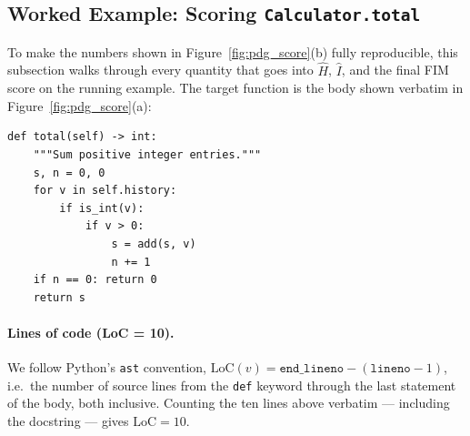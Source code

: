 
\subsection{Worked Example: Scoring \texttt{Calculator.total}}
\label{app:algo:worked_example}

To make the numbers shown in Figure~\ref{fig:pdg_score}(b) fully
reproducible, this subsection walks through every quantity that goes
into $\hat{H}$, $\hat{I}$, and the final FIM score on the running
example. The target function is the body shown verbatim in
Figure~\ref{fig:pdg_score}(a):
%
\begin{center}\small
\begin{minipage}{0.78\linewidth}
\begin{verbatim}
def total(self) -> int:
    """Sum positive integer entries."""
    s, n = 0, 0
    for v in self.history:
        if is_int(v):
            if v > 0:
                s = add(s, v)
                n += 1
    if n == 0: return 0
    return s
\end{verbatim}
\end{minipage}
\end{center}

\paragraph{Lines of code (\textnormal{LoC} = 10).}
We follow Python's \texttt{ast} convention,
$\mathrm{LoC}(v)=\texttt{end\_lineno}-(\texttt{lineno}-1)$, i.e.\ the
number of source lines from the \texttt{def} keyword through the last
statement of the body, both inclusive. Counting the ten lines above
verbatim --- including the docstring --- gives $\mathrm{LoC}=10$.

